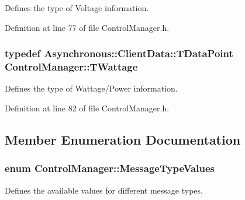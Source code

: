 Defines the type of Voltage information. 



Definition at line 77 of file Control\-Manager.\-h.

\hypertarget{class_control_manager_a24609feed8b0443df450b070194df20a}{
\subsubsection[{T\-Wattage}]{\setlength{\rightskip}{0pt plus 5cm}typedef {\bf Asynchronous\-::\-Client\-Data\-::\-T\-Data\-Point} {\bf Control\-Manager\-::\-T\-Wattage}}}\label{class_control_manager_a24609feed8b0443df450b070194df20a}


Defines the type of Wattage/\-Power information. 



Definition at line 82 of file Control\-Manager.\-h.



\subsection{Member Enumeration Documentation}
\hypertarget{class_control_manager_a7b6de4a130e0de1729c7963edd972120}{
\subsubsection[{Message\-Type\-Values}]{\setlength{\rightskip}{0pt plus 5cm}enum {\bf Control\-Manager\-::\-Message\-Type\-Values}\hspace{0.3cm}{\ttfamily [private]}}}\label{class_control_manager_a7b6de4a130e0de1729c7963edd972120}


Defines the available values for different message types. 


